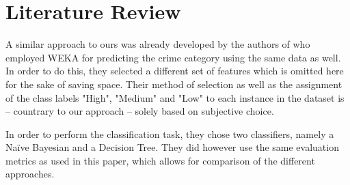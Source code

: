 \section{Literature Review}
A similar approach to ours was already developed by the authors of
\cite{indian} who employed WEKA for predicting the crime category
using the same data as well. In order to do this, they selected a
different set of features which is omitted here for the sake of saving
space. Their method of selection as well as the assignment of the
class labels "High", "Medium" and "Low" to each instance in the
dataset is -- countrary to our approach -- solely based on subjective
choice.

In order to perform the classification task, they chose two
classifiers, namely a Na\"ive Bayesian and a Decision Tree. They did
however use the same evaluation metrics as used in this paper, which
allows for comparison of the different approaches.\\



